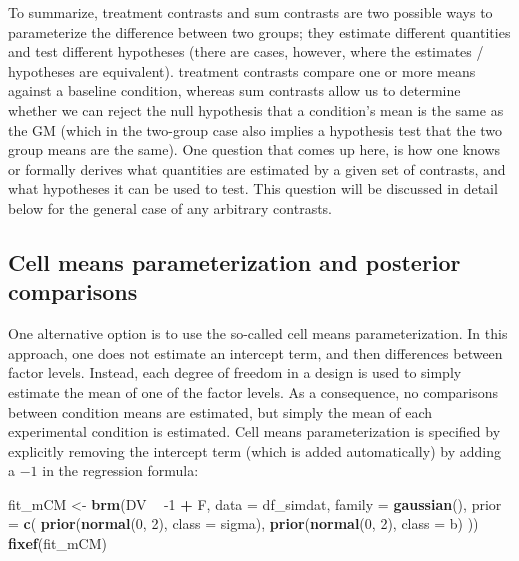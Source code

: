 \documentclass[12pt,]{krantz}
\newenvironment{Shaded}{\begin{snugshade}}{\end{snugshade}}
\newcommand{\DataTypeTok}[1]{\textcolor[rgb]{0.13,0.29,0.53}{#1}}
\newcommand{\DecValTok}[1]{\textcolor[rgb]{0.00,0.00,0.81}{#1}}
\newcommand{\KeywordTok}[1]{\textcolor[rgb]{0.13,0.29,0.53}{\textbf{#1}}}
\newcommand{\NormalTok}[1]{#1}
\newcommand{\OperatorTok}[1]{\textcolor[rgb]{0.81,0.36,0.00}{\textbf{#1}}}
\newcommand{\StringTok}[1]{\textcolor[rgb]{0.31,0.60,0.02}{#1}}
\theoremstyle{definition}
\theoremstyle{definition}
\theoremstyle{definition}
\theoremstyle{remark}
\begin{document}
To summarize, treatment contrasts and sum contrasts are two possible ways to parameterize the difference between two groups; they estimate different quantities and test different hypotheses (there are cases, however, where the estimates / hypotheses are equivalent). treatment contrasts compare one or more means against a baseline condition, whereas sum contrasts allow us to determine whether we can reject the null hypothesis that a condition's mean is the same as the GM (which in the two-group case also implies a hypothesis test that the two group means are the same). One question that comes up here, is how one knows or formally derives what quantities are estimated by a given set of contrasts, and what hypotheses it can be used to test. This question will be discussed in detail below for the general case of any arbitrary contrasts.

\hypertarget{cell-means-parameterization-and-posterior-comparisons}{%
\subsection{Cell means parameterization and posterior comparisons}\label{cell-means-parameterization-and-posterior-comparisons}}

One alternative option is to use the so-called cell means parameterization. In this approach, one does not estimate an intercept term, and then differences between factor levels. Instead, each degree of freedom in a design is used to simply estimate the mean of one of the factor levels. As a consequence, no comparisons between condition means are estimated, but simply the mean of each experimental condition is estimated. Cell means parameterization is specified by explicitly removing the intercept term (which is added automatically) by adding a \(-1\) in the regression formula:

\begin{Shaded}
\begin{Highlighting}[]
\NormalTok{fit_mCM <-}\StringTok{ }\KeywordTok{brm}\NormalTok{(DV }\OperatorTok{~}\StringTok{ }\DecValTok{-1} \OperatorTok{+}\StringTok{ }\NormalTok{F,}
                 \DataTypeTok{data =}\NormalTok{ df_simdat,}
                 \DataTypeTok{family =} \KeywordTok{gaussian}\NormalTok{(),}
                 \DataTypeTok{prior =} \KeywordTok{c}\NormalTok{(}
                     \KeywordTok{prior}\NormalTok{(}\KeywordTok{normal}\NormalTok{(}\DecValTok{0}\NormalTok{, }\DecValTok{2}\NormalTok{), }\DataTypeTok{class =}\NormalTok{ sigma),}
                     \KeywordTok{prior}\NormalTok{(}\KeywordTok{normal}\NormalTok{(}\DecValTok{0}\NormalTok{, }\DecValTok{2}\NormalTok{), }\DataTypeTok{class =}\NormalTok{ b)}
\NormalTok{                 )) }
\KeywordTok{fixef}\NormalTok{(fit_mCM)}
\end{Highlighting}
\end{Shaded}
\end{document}
